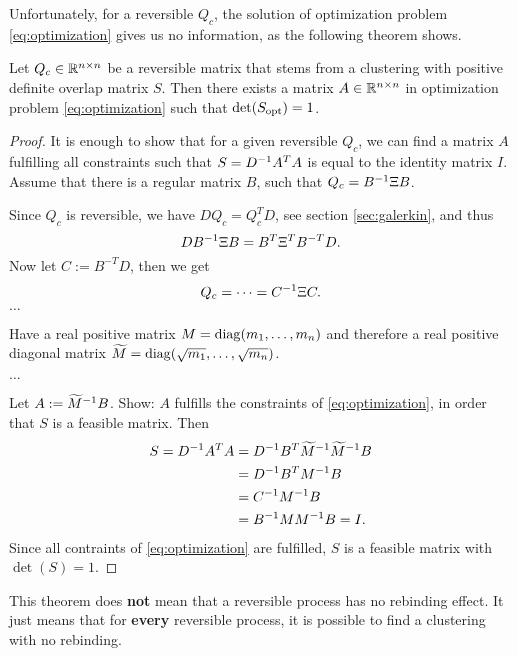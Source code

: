 Unfortunately, for a reversible $Q_c$, the solution of optimization problem \eqref{eq:optimization} gives us no information, as the following theorem shows.
\begin{thm}
Let $Q_c \in \mathbb{R}^{n \times n}$ be a reversible matrix that stems from a clustering with positive definite overlap matrix $S$. Then there exists a matrix $A \in \mathbb{R}^{n \times n}$ in optimization problem \eqref{eq:optimization} such that $\det(S_{\mathrm{opt}}) = 1$.
\end{thm}
\begin{proof}
It is enough to show that for a given reversible $Q_c$, we can find a matrix $A$ fulfilling all constraints such that $S=D^{-1} A^TA$ is equal to the identity matrix $I$.
\\

Assume that there is a regular matrix $B$, such that $Q_c = B^{-1} \Xi B$.

Since $Q_c$ is reversible, we have $DQ_c = Q_c^T D$, see section \ref{sec:galerkin}, and thus
\begin{equation*}
DB^{-1}\Xi B = B^T\Xi^T B^{-T}D.
\end{equation*}
Now let $C:= B^{-T}D$, then we get
\begin{equation*}
Q_c = \dots = C^{-1} \Xi C.
\end{equation*}
$\dots$

Have a real positive matrix $M = \mathrm{diag} (m_1,\dots,m_n)$  and therefore a real positive diagonal matrix $\widetilde{M} = \mathrm{diag} (\sqrt{m_1}, \dots, \sqrt{m_n})$.

$\dots$

Let $A:= \widetilde{M}^{-1} B$. Show: $A$ fulfills the constraints of \eqref{eq:optimization}, in order that $S$ is a feasible matrix. Then
\begin{align*}
S = D^{-1} A^TA  & = D^{-1} B^T \widetilde{M}^{-1} \widetilde{M}^{-1} B \\
			 & = D^{-1} B^T M^{-1} B \\
		 	& = C^{-1} M^{-1} B         \\
			& = B^{-1} MM^{-1} B = I.
\end{align*}
Since all contraints of \eqref{eq:optimization} are fulfilled, $S$ is a feasible matrix with $\det(S) =1$.
\end{proof}

This theorem does \textbf{not} mean that a reversible process has no rebinding effect. It just means that for \textbf{every} reversible process, it is possible to find a clustering with no rebinding.

